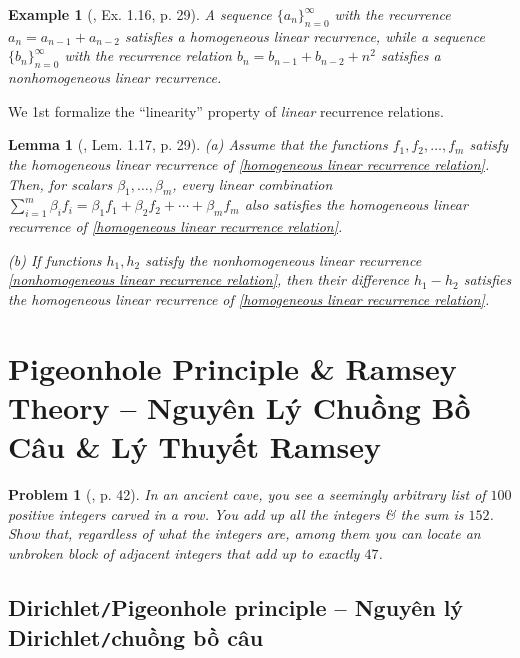 \documentclass[oneside]{book}
\newtheorem{example}{Example}
\newtheorem{lemma}{Lemma}
\newtheorem{problem}{Problem}
\begin{document}
\begin{example}[\cite{Shahriari2022}, Ex. 1.16, p. 29]
	A sequence $\{a_n\}_{n=0}^\infty$ with the recurrence $a_n = a_{n-1} + a_{n-2}$ satisfies a homogeneous linear recurrence, while a sequence $\{b_n\}_{n=0}^\infty$ with the recurrence relation $b_n = b_{n-1} + b_{n-2} + n^2$ satisfies a nonhomogeneous linear recurrence.
\end{example}
We 1st formalize the ``linearity'' property of {\it linear} recurrence relations.

\begin{lemma}[\cite{Shahriari2022}, Lem. 1.17, p. 29]
	(a) Assume that the functions $f_1,f_2,\ldots,f_m$ satisfy the homogeneous linear recurrence of \eqref{homogeneous linear recurrence relation}. Then, for scalars $\beta_1,\ldots,\beta_m$, every linear combination $\sum_{i=1}^m \beta_if_i = \beta_1f_1 + \beta_2f_2 + \cdots + \beta_mf_m$ also satisfies the homogeneous linear recurrence of \eqref{homogeneous linear recurrence relation}.
	\item (b) If functions $h_1,h_2$ satisfy the nonhomogeneous linear recurrence \eqref{nonhomogeneous linear recurrence relation}, then their difference $h_1 - h_2$ satisfies the homogeneous linear recurrence of \eqref{homogeneous linear recurrence relation}.
\end{lemma}


\section{Pigeonhole Principle \& Ramsey Theory -- Nguyên Lý Chuồng Bồ Câu \& Lý Thuyết Ramsey}

\begin{problem}[\cite{Shahriari2022}, p. 42]
	In an ancient cave, you see a seemingly arbitrary list of $100$ positive integers carved in a row. You add up all the integers \& the sum is $152$. Show that, regardless of what the integers are, among them you can locate an unbroken block of adjacent integers that add up to exactly $47$.
\end{problem}


\subsection{Dirichlet{\tt/}Pigeonhole principle -- Nguyên lý Dirichlet{\tt/}chuồng bồ câu}
\end{document}
